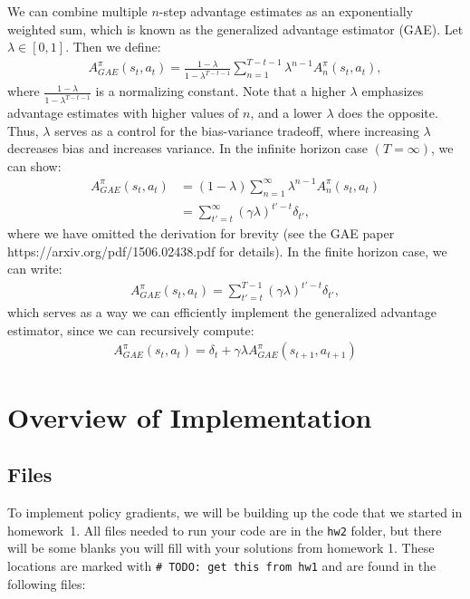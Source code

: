 \documentclass{article}
\begin{document}
We can combine multiple $n$-step advantage estimates as an exponentially weighted sum, which is known as the generalized advantage estimator (GAE). Let $\lambda \in [0, 1]$. Then we define:
\begin{align}
A_{GAE}^\pi(s_t, a_t) = \frac{1-\lambda}{1-\lambda^{T-t-1}} \sum_{n=1}^{T-t-1} \lambda^{n-1} A_n^\pi(s_{t}, a_{t}),
\end{align}
where $\frac{1-\lambda}{1-\lambda^{T-t-1}}$ is a normalizing constant. Note that a higher $\lambda$ emphasizes advantage estimates with higher values of $n$, and a lower $\lambda$ does the opposite. Thus, $\lambda$ serves as a control for the bias-variance tradeoff, where increasing $\lambda$ decreases bias and increases variance. In the infinite horizon case $(T = \infty)$, we can show:
\begin{align}
 A_{GAE}^\pi(s_t, a_t) &= (1-\lambda) \sum_{n=1}^{\infty} \lambda^{n-1} A_n^\pi(s_{t}, a_{t}) \\
 &= \sum_{t'={t}}^\infty (\gamma \lambda)^{t'-t} \delta_{t'},
\end{align}
where we have omitted the derivation for brevity (see the GAE paper https://arxiv.org/pdf/1506.02438.pdf for details). In the finite horizon case, we can write: 
\begin{align}
 A_{GAE}^\pi(s_t, a_t) = \sum_{t'={t}}^{T-1} (\gamma \lambda)^{t'-t} \delta_{t'},
\end{align}
which serves as a way we can efficiently implement the generalized advantage estimator, since we can recursively compute:
\begin{align}
A_{GAE}^\pi(s_{t}, a_{t}) = \delta_t + \gamma \lambda A_{GAE}^\pi(s_{t+1}, a_{t+1})
\end{align}

\newpage

\section{Overview of Implementation}


\subsection{Files}
To implement policy gradients, we will be building up the code that we started in homework~1. All files needed to run your code are in the \texttt{hw2} folder, but there will be some blanks you will fill with your solutions from homework 1. These locations are marked with \texttt{\#~TODO: get this from hw1} and are found in the following files:
\end{document}
